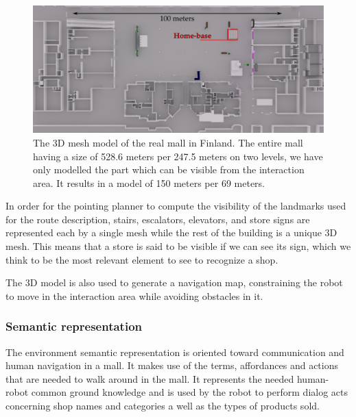 \begin{figure}[ht!]
\centering
\includegraphics[scale=0.15]{figures/chapter8/ideapark_base_m.png}
\caption{\label{fig:chap8_ideapark_base} The 3D mesh model of the real mall in Finland. The entire mall having a size of 528.6 meters per 247.5 meters on two levels, we have only modelled the part which can be visible from the interaction area. It results in a model of 150 meters per 69 meters. }
\end{figure}

In order for the pointing planner to compute the visibility of the landmarks used for the route description, stairs, escalators, elevators, and store signs are represented each by a single mesh while the rest of the building is a unique 3D mesh. This means that a store is said to be visible if we can see its sign, which we think to be the most relevant element to see to recognize a shop.

The 3D model is also used to generate a navigation map, constraining the robot to move in the interaction area while avoiding obstacles in it.

\subsubsection{Semantic representation}

The environment semantic representation is oriented toward communication and human navigation in a mall. It makes use of the terms, affordances and actions that are needed to walk around in the mall. It represents the needed human-robot common ground knowledge and is used by the robot to perform dialog acts concerning shop names and categories a well as the types of products sold.

